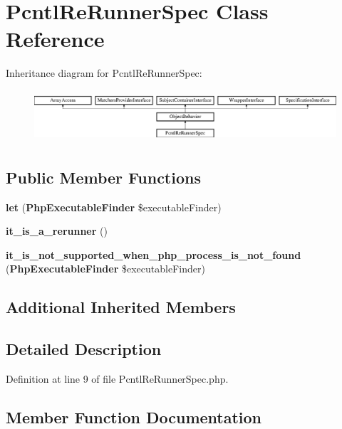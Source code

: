 \section{Pcntl\+Re\+Runner\+Spec Class Reference}
\label{classspec_1_1_php_spec_1_1_process_1_1_re_runner_1_1_pcntl_re_runner_spec}
Inheritance diagram for Pcntl\+Re\+Runner\+Spec\+:\begin{figure}[H]
\begin{center}
\leavevmode
\includegraphics[height=1.953488cm]{classspec_1_1_php_spec_1_1_process_1_1_re_runner_1_1_pcntl_re_runner_spec}
\end{center}
\end{figure}
\subsection*{Public Member Functions}
\begin{DoxyCompactItemize}
\item 
{\bf let} ({\bf Php\+Executable\+Finder} \$executable\+Finder)
\item 
{\bf it\+\_\+is\+\_\+a\+\_\+rerunner} ()
\item 
{\bf it\+\_\+is\+\_\+not\+\_\+supported\+\_\+when\+\_\+php\+\_\+process\+\_\+is\+\_\+not\+\_\+found} ({\bf Php\+Executable\+Finder} \$executable\+Finder)
\end{DoxyCompactItemize}
\subsection*{Additional Inherited Members}


\subsection{Detailed Description}


Definition at line 9 of file Pcntl\+Re\+Runner\+Spec.\+php.



\subsection{Member Function Documentation}
